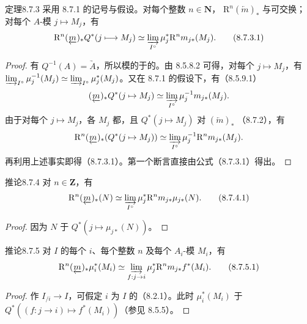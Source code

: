 \begin{SGAresult}{定理}{8.7.3}
采用 8.7.1 的记号与假设。对每个整数 $n\in\mathbf N$， $\mathrm R^n(\underleftarrow m)_*$ 与可交换；对每个 $A$-模 $j\mapsto M_j$，有
\[
 \mathrm R^n(\underleftarrow m)_*Q^*(j\longmapsto M_j)
 \simeq\varinjlim_{I^\circ}\mu_j^*\mathrm R^nm_{j*}(M_j).\tag{8.7.3.1}
\]
\end{SGAresult}
\begin{proof}
有 $Q^{-1}(A)=\underrightarrow A$，所以模的于的。由 8.5.8.2 可得，对每个 $j\mapsto M_j$，有 $\varinjlim_{I^\circ}\mu_j^{-1}(M_j)\simeq\varinjlim_{I^\circ}\mu_j^*(M_j)$。又在 8.7.1 的假设下，有（8.5.9.1）
\[
 (\underleftarrow m)_*Q^*(j\mapsto M_j)\simeq
 \varinjlim_{I^\circ}\mu_j^{-1}m_{j*}(M_j).
\]
由于对每个 $j\mapsto M_j$，各 $M_j$ 都，且 $Q^*(j\mapsto M_j)$ 对 $(\underleftarrow m)_*$ （8.7.2），有
\[
 \mathrm R^n(\underleftarrow m)_*(Q^*(j\mapsto M_j))\simeq
 \varinjlim_{I^\circ}\mu_j^{-1}\mathrm R^nm_{j*}(M_j).
\]
再利用上述事实即得（8.7.3.1）。第一个断言直接由公式（8.7.3.1）得出。
\end{proof}

\begin{SGAresult}{推论}{8.7.4}
对 $n\in\mathbf Z$，有
\[
 \mathrm R^n(\underleftarrow m)_*(N)\simeq
 \varinjlim_{I^\circ}\mu_j^*\mathrm R^nm_{j*}\mu_{j*}(N).\tag{8.7.4.1}
\]
\end{SGAresult}
\begin{proof}
因为 $N$ 于 $Q^*(j\mapsto\mu_{j*}(N))$。
\end{proof}

\begin{SGAresult}{推论}{8.7.5}
对 $I$ 的每个 $i$、每个整数 $n$ 及每个 $A_i$-模 $M_i$，有
\[
 \mathrm R^n(\underleftarrow m)_*\mu_i^*(M_i)\simeq
 \varinjlim_{f:j\to i}\mu_j^*\mathrm R^nm_{j*}f^*(M_i).\tag{8.7.5.1}
\]
\end{SGAresult}
\begin{proof}
作 $I_{/i}\to I$，可假定 $i$ 为 $I$ 的（8.2.1）。此时 $\mu_i^*(M_i)$ 于 $Q^*((f:j\to i)\mapsto f^*(M_i))$（参见 8.5.5）。
\end{proof}

